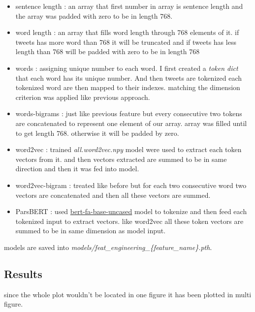 \documentclass[10pt, a4paper]{article}
\begin{document}
\begin{itemize}
    \item sentence length : an array that first number in array is sentence length and the array was padded with zero to be in length 768.
    \item word length : an array that fills word length through 768 elements of it. if tweets has more word than 768 it will be truncated and if tweets has less length than 768 will be padded with zero to be in length 768
    \item words : assigning unique number to each word. I first created a \textit{token dict} that each word has its unique number. And then tweets are tokenized each tokenized word are then mapped to their indexes. matching the dimension criterion was applied like previous approach.
    \item words-bigrams : just like previous feature but every consecutive two tokens are concatenated to represent one element of our array. array was filled until to get length 768. otherwise it will be padded by zero.
    \item word2vec : trained \textit{all.word2vec.npy} model were used to extract each token vectors from it. and then vectors extracted are summed to be in same direction and then it was fed into model.
    \item word2vec-bigram : treated like before but for each two consecutive word two vectors are concatenated and then all these vectors are summed.
    \item ParsBERT : used \href{https://huggingface.co/HooshvareLab/bert-fa-base-uncased}{bert-fa-base-uncased} model to tokenize and then feed each tokenized input to extract vectors. like word2vec all these token vectors are summed to be in same dimension as model input.
\end{itemize}
models are saved into \textit{models/feat\_engineering\_\{feature\_name\}.pth}.
\subsection{Results}
since the whole plot wouldn't be located in one figure it has been plotted in multi figure.
\end{document}
